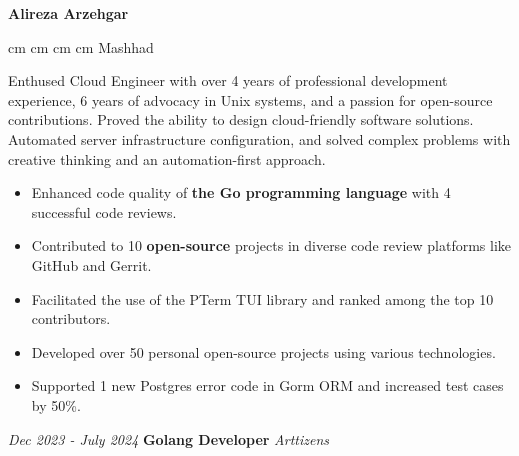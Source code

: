 \documentclass{engineercv}
\begin{document}
\begin{center}
  \textbf{\fontsize{24 pt}{24 pt}\selectfont Alireza Arzehgar}

  \vspace{0.2 cm}

  \scriptsize
  \mbox{}
   cm
  \mbox{}
   cm
  \mbox{}
   cm
  \mbox{}
   cm
  \mbox{{\color{black}\footnotesize\faMapMarker*}\hspace*{0.13cm}Mashhad}
\end{center}

Enthused Cloud Engineer with over 4 years of professional development experience,
6 years of advocacy in Unix systems, and a passion for open-source contributions. Proved the ability
to design cloud-friendly software solutions. Automated server infrastructure configuration,
and solved complex problems with creative thinking and an automation-first approach.

\begin{itemize}
  \item Enhanced code quality of \textbf{the Go programming language} with 4 successful code reviews.
  \item Contributed to 10 \textbf{open-source} projects in diverse code review platforms like GitHub and Gerrit.
  \item Facilitated the use of the PTerm TUI library and ranked among the top 10 contributors.
  \item Developed over 50 personal open-source projects using various technologies.
  \item Supported 1 new Postgres error code in Gorm ORM and increased test cases by 50\%.
\end{itemize}

\begin{twocolentry}{\textit{Dec 2023 - July 2024}}
  \textbf{Golang Developer}
  \textit{Arttizens}
\end{twocolentry}
\end{document}
